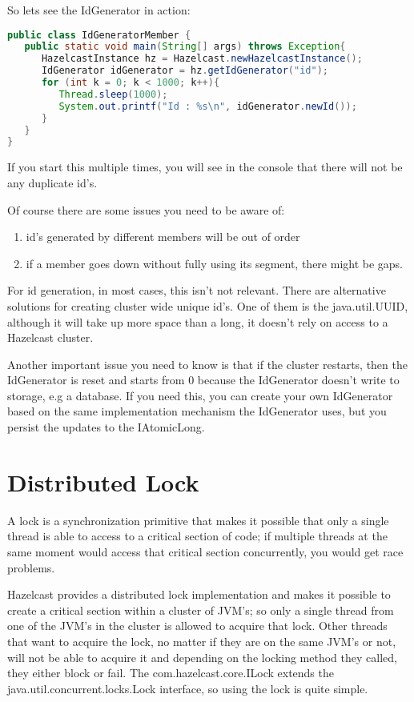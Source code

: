 So lets see the IdGenerator in action:
\begin{lstlisting}[language=java]
public class IdGeneratorMember {
   public static void main(String[] args) throws Exception{
      HazelcastInstance hz = Hazelcast.newHazelcastInstance();
      IdGenerator idGenerator = hz.getIdGenerator("id");
      for (int k = 0; k < 1000; k++){
         Thread.sleep(1000);
         System.out.printf("Id : %s\n", idGenerator.newId());
      }
   }
}
\end{lstlisting}
If you start this multiple times, you will see in the console that there will not be any duplicate id's.

Of course there are some issues you need to be aware of:
\begin{enumerate}
\item id's generated by different members will be out of order
\item if a member goes down without fully using its segment, there might be gaps.
\end{enumerate}
For id generation, in most cases, this isn't not relevant. There are alternative solutions for creating cluster wide unique id's. One of them is the java.util.UUID, although it will take up more space than a long, it doesn't rely on access to a Hazelcast cluster.

Another important issue you need to know is that if the cluster restarts, then the IdGenerator is reset and starts from 0 because the IdGenerator doesn't write to storage, e.g a database. If you need this, you can create your own IdGenerator based on the same implementation mechanism the IdGenerator uses, but you persist the updates to the IAtomicLong.

\section{Distributed Lock}
A lock is a synchronization primitive that makes it possible that only a single thread is able to access to a critical section of code; if multiple threads at the same moment would access that critical section concurrently, you would get race problems. 

Hazelcast provides a distributed lock implementation and makes it possible to create a critical section within a cluster of JVM's; so only a single thread from one of the JVM's in the cluster is allowed to acquire that lock. Other threads that want to acquire the lock, no matter if they are on the same JVM's or not, will not be able to acquire it and depending on the locking method they called, they either block or fail. The com.hazelcast.core.ILock extends the java.util.concurrent.locks.Lock interface, so using the lock is quite simple.

